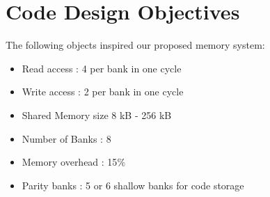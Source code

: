 \section{Code Design Objectives}

The following objects inspired our proposed memory system:
\begin{itemize}
\item Read access : 4 per bank in one cycle
\item Write access : 2 per bank in one cycle
\item Shared Memory size 8 kB - 256 kB
\item Number of Banks : 8
\item Memory overhead : 15$ \% $
\item Parity banks : 5 or 6 shallow banks for code storage
\end{itemize}

